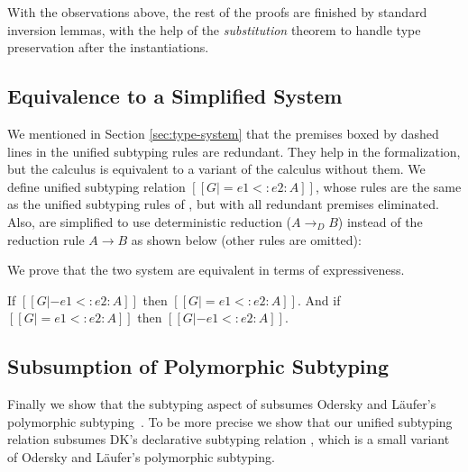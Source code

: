 With the observations above, the rest of the proofs are finished by standard
inversion lemmas, with the help of the \emph{substitution} theorem to handle type
preservation after the instantiations.

\subsection{Equivalence to a Simplified System}
We mentioned in Section \ref{sec:type-system} that the premises boxed by dashed
lines in the unified subtyping rules are redundant.
They help in the formalization, but the calculus
is equivalent to a variant of the calculus without them.
We define unified subtyping relation
$[[G |= e1 <: e2 : A]]$, whose rules are the same as the unified subtyping rules of \name,
but with all redundant premises eliminated. Also, 
are simplified to use deterministic reduction ($A \longrightarrow_D B$)
instead of the reduction rule $A \longrightarrow B$ as shown below
(other rules are omitted):


We prove that the two system are equivalent in terms of expressiveness.

\begin{theorem}
  If $[[G |- e1 <: e2 : A]]$ then $[[G |= e1 <: e2 : A]]$.
  And if $[[G |= e1 <: e2 : A]]$ then $[[G |- e1 <: e2 : A]]$.
\end{theorem}

\subsection{Subsumption of Polymorphic Subtyping}

Finally we show that the subtyping aspect of \name subsumes
Odersky and L\"aufer's polymorphic
subtyping~\citep{odersky1996putting}. To be more precise
we show that our unified subtyping relation subsumes DK's declarative
subtyping relation \citep{dunfield2013complete}, which is a small variant of
Odersky and L\"aufer's polymorphic subtyping.

